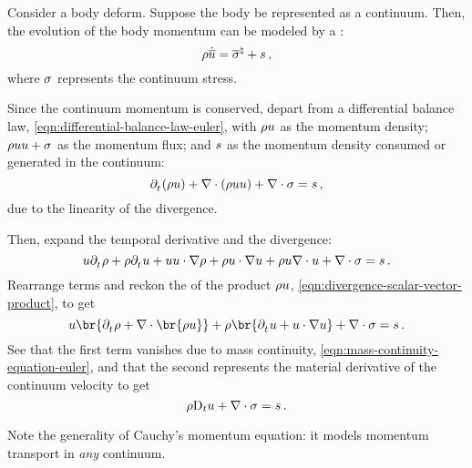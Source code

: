 \begin{model}
  Consider a body deform. Suppose the body be represented as a continuum. Then, the evolution of the body momentum can be modeled by a :
  \begin{equation}\label{eqn:cauchy-momentum-equation-lagrange}
    \rho\dot{\overline{u}} = {\overline{\sigma}}^{\natural} + s\,,
  \end{equation}
  where $\sigma$ represents the continuum stress.
\end{model}
%
\begin{argument}
  Since the continuum momentum is conserved, depart from a differential balance law, \cref{eqn:differential-balance-law-euler}, with $\rho u$ as the momentum density; $\rho uu + \sigma$ as the momentum flux; and $s$ as the momentum density consumed or generated in the continuum:
  \begin{equation*}
    \cpd t\vat{\dens\vel} + \odiv\vat{\dens\vel\vel} + \odiv\stress
    = \ssink\,,
  \end{equation*}
  due to the linearity of the divergence.

  Then, expand the temporal derivative and the divergence:
  \begin{equation*}
    \vel\cpd t\dens + \dens\cpd t\vel
    + \vel\vel\iprod\ograd\dens + \dens\vel\iprod\ograd\vel
    + \dens\vel\odiv\vel
    + \odiv\stress
    = \ssink\,.
  \end{equation*}
  Rearrange terms and reckon the  of the product $\rho u$, \cref{eqn:divergence-scalar-vector-product}, to get
  \begin{equation*}
    \vel\br{\cpd t\dens + \odiv\br{\dens\vel}}
    + \dens\br{\cpd t\vel + \vel\iprod\ograd\vel}
    + \odiv\stress
    = \ssink\,.
  \end{equation*}
  See that the first term vanishes due to mass continuity, \cref{eqn:mass-continuity-equation-euler}, and that the second represents the material derivative of the continuum velocity to get
  \begin{equation*}
    \rho\mathrm{D}_{t}u
    + \nabla\cdot\sigma
    = s\,.
  \end{equation*}
\end{argument}
%
Note the generality of Cauchy's momentum equation: it models momentum transport in \emph{any} continuum.
